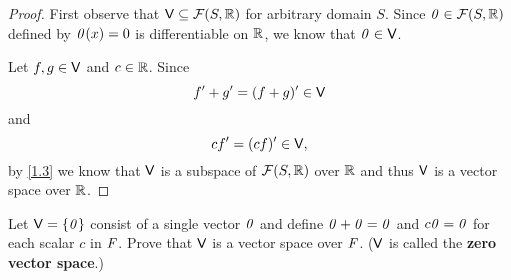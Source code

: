 \begin{proof}
  First observe that \(\V \subseteq \fs{S}{\R}\) for arbitrary domain \(S\).
  Since \(\zv \in \fs{S}{\R}\) defined by \(\mathit{0}(x) = 0\) is differentiable on \(\mathbb{R}\), we know that \(\mathit{0} \in \mathsf{V}\).

  Let \(f, g \in \mathsf{V}\) and \(c \in \mathbb{R}\).
  Since
  \[
    f' + g' = (f + g)' \in \mathsf{V}
  \]
  and
  \[
    cf' = (cf)' \in \mathsf{V},
  \]
  by \cref{1.3} we know that \(\mathsf{V}\) is a subspace of \(\fs{S}{\R}\) over \(\mathbb{R}\) and thus \(\mathsf{V}\) is a vector space over \(\mathbb{R}\).
\end{proof}

\begin{ex}\label{ex:1.2.11}
  Let \(\mathsf{V} = \left\lbrace\mathit{0}\right\rbrace\) consist of a single vector \(\mathit{0}\) and define \(\mathit{0} + \mathit{0} = \mathit{0}\) and \(c\mathit{0} = \mathit{0}\) for each scalar \(c\) in \(\mathit{F}\).
  Prove that \(\mathsf{V}\) is a vector space over \(\mathit{F}\).
  (\(\mathsf{V}\) is called the \textbf{zero vector space}.)
\end{ex}

